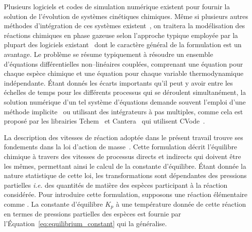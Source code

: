 Plusieurs logiciels et codes de simulation numérique existent pour fournir la solution de l'évolution de systèmes cinétiques chimiques. Même si plusieurs autres méthodes d'intégration de ces systèmes existent~\cite{Berberan1990, Park201342,Parumasur2005473,Bizetti2012}, on traitera la modélisation des réactions chimiques en phase gazeuse selon l'approche typique employée par la plupart des logiciels existant~\cite{Premix1998,Chemkin2000,Transport2000, SurfaceChemkin2000,Damian20021567,DetchemKin,Tchem2011,Cantera2014} dont le caractère général de la formulation est un avantage. Le problème se résume typiquement à résoudre un ensemble d'équations différentielles non--linéaires couplées, comprenant une équation pour chaque espèce chimique et une équation pour chaque variable thermodynamique indépendante. Étant donnés les écarts importants qu'il peut y avoir entre les échelles de temps pour les différents processus qui se déroulent simultanément, la solution numérique d'un tel système d'équations demande souvent l'emploi d'une méthode implicite~\cite{Coles2011} ou utilisant des intégrateurs à pas multiples, comme cela est proposé par les librairies Tchem~\cite{Tchem2011} et Cantera~\cite{Cantera2014} qui utilisent CVode~\cite{Hindmarsh2005}.

La description des vitesses de réaction adoptée dans le présent travail trouve ses fondements dans la loi d'action de masse~\cite{Landau1980}.  Cette formulation décrit l'équilibre chimique à travers des vitesses de processus directs et indirects qui doivent être les mêmes, permettant ainsi le calcul de la constante d'équilibre. Étant donnée la nature statistique de cette loi, les transformations sont dépendantes des pressions partielles \textendash{} \emph{i.e.} des quantités de matière \textendash{} des espèces participant à la réaction considérée. Pour introduire cette formulation, supposons une réaction élémentaire comme . La constante d'équilibre $K_{p}$ à une température donnée de cette réaction en termes de pressions partielles des espèces est fournie par l'Équation~\ref{eq:equilibrium_constant} qui la généralise. %

